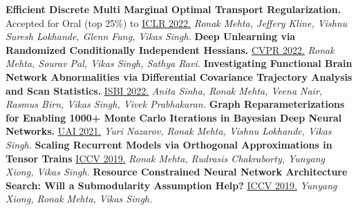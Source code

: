 \documentclass[]{article}
\begin{document}
\noindent
{\bf Efficient Discrete Multi Marginal Optimal Transport Regularization.}
\newline
Accepted for Oral (top 25\%)  to \href{https://openreview.net/forum?id=R98ZfMt-jE}{ICLR 2022.}
\newline
\textit{Ronak Mehta, Jeffery Kline, Vishnu Suresh Lokhande, Glenn Fung, Vikas Singh.}
\newline\newline
{\bf Deep Unlearning via Randomized Conditionally Independent Hessians.}
\newline
\href{https://openaccess.thecvf.com/content/CVPR2022/html/Mehta_Deep_Unlearning_via_Randomized_Conditionally_Independent_Hessians_CVPR_2022_paper.html}{CVPR 2022.}
\textit{Ronak Mehta, Sourav Pal, Vikas Singh, Sathya Ravi.}
\newline\newline
{\bf Investigating Functional Brain Network Abnormalities via Differential Covariance Trajectory Analysis and Scan Statistics.}
\newline
\href{https://ieeexplore.ieee.org/document/9761442}{ISBI 2022.}
\textit{Anita Sinha, Ronak Mehta, Veena Nair, Rasmus Birn, Vikas Singh, Vivek Prabhakaran.}
\newline\newline
{\bf Graph Reparameterizations for Enabling 1000+ Monte Carlo Iterations in Bayesian Deep Neural Networks.}
\newline
\href{https://proceedings.mlr.press/v161/nazarovs21b.html}{UAI 2021.}
\textit{Yuri Nazarov, Ronak Mehta, Vishnu Lokhande, Vikas Singh.}
\newline\newline
{\bf Scaling Recurrent Models via Orthogonal Approximations in Tensor Trains}
\newline
\href{http://openaccess.thecvf.com/content_ICCV_2019/html/Mehta_Scaling_Recurrent_Models_via_Orthogonal_Approximations_in_Tensor_Trains_ICCV_2019_paper.html}{ICCV 2019.}
\textit{Ronak Mehta, Rudrasis Chakraborty, Yunyang Xiong, Vikas Singh.}
\newline\newline
{\bf Resource Constrained Neural Network Architecture Search: Will a Submodularity Assumption Help?}
\newline
\href{http://openaccess.thecvf.com/content_ICCV_2019/html/Xiong_Resource_Constrained_Neural_Network_Architecture_Search_Will_a_Submodularity_Assumption_ICCV_2019_paper.html}{ICCV 2019.}
\textit{Yunyang Xiong, Ronak Mehta, Vikas Singh.}
\newline\newline
\end{document}
